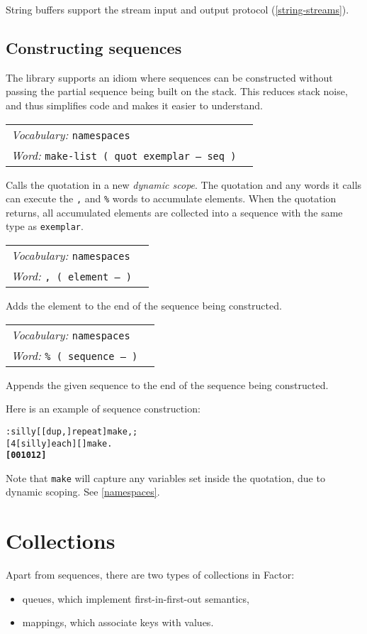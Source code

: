 \documentclass{book}
\newcommand{\tto}{\symbol{123}}
\newcommand{\ttc}{\symbol{125}}
\newcommand{\vocabulary}[1]{\emph{Vocabulary:} \texttt{#1}&\\}
\newcommand{\ordinaryword}[2]{\index{\texttt{#1}}\emph{Word:} \texttt{#2}&\\}
\newcommand{\wordtable}[1]{


\begin{tabularx}{12cm}{lX}
\hline
#1
\hline
\end{tabularx}

}
\begin{document}
String buffers support the stream input and output protocol (\ref{string-streams}).

\section{Constructing sequences}\label{make-seq}

The library supports an idiom where sequences can be constructed without passing the partial sequence being built on the stack. This reduces stack noise, and thus simplifies code and makes it easier to understand.

\newcommand{\dynamicscopeglos}{}
\dynamicscopeglos
\wordtable{
\vocabulary{namespaces}
\ordinaryword{make}{make-list ( quot exemplar -- seq )}
}
Calls the quotation in a new \emph{dynamic scope}. The quotation and any words it calls can execute the \texttt{,} and \texttt{\%} words to accumulate elements. When the quotation returns, all accumulated elements are collected into a sequence with the same type as \verb|exemplar|.
\wordtable{
\vocabulary{namespaces}
\ordinaryword{,}{,~( element -- )}
}
Adds the element to the end of the sequence being constructed.
\wordtable{
\vocabulary{namespaces}
\ordinaryword{\%}{\% ( sequence -- )}
}
Appends the given sequence to the end of the sequence being constructed.

Here is an example of sequence construction:
\begin{alltt}
  : silly [ [ dup , ] repeat ] \tto \ttc make , ;
  [ 4 [ silly ] each ] [ ] make .
\textbf{[ \tto \ttc \tto 0 \ttc \tto 0 1 \ttc \tto 0 1 2 \ttc ]}
\end{alltt}

Note that \verb|make| will capture any variables set inside the quotation, due to dynamic scoping. See \ref{namespaces}.

\chapter{Collections}


Apart from sequences, there are two types of collections in Factor:
\begin{itemize}
\item queues, which implement first-in-first-out semantics,
\item mappings, which associate keys with values.
\end{itemize}
\end{document}
